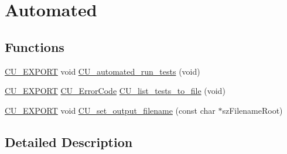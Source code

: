 \hypertarget{group___automated}{\section{Automated}
\label{group___automated}
}
\subsection*{Functions}
\begin{DoxyCompactItemize}
\item 
\hyperlink{group___framework_ga22e538403fdee24be3388ab473fe64d5}{C\+U\+\_\+\+E\+X\+P\+O\+R\+T} void \hyperlink{group___automated_ga4204c6d187aa6c366a8f4e0ba50645b4}{C\+U\+\_\+automated\+\_\+run\+\_\+tests} (void)
\item 
\hyperlink{group___framework_ga22e538403fdee24be3388ab473fe64d5}{C\+U\+\_\+\+E\+X\+P\+O\+R\+T} \hyperlink{group___framework_ga743a2a025ee3eb792d7d85f0eea347e6}{C\+U\+\_\+\+Error\+Code} \hyperlink{group___automated_ga4bf1c3a0b54cb2a12d634e7e022edf30}{C\+U\+\_\+list\+\_\+tests\+\_\+to\+\_\+file} (void)
\item 
\hyperlink{group___framework_ga22e538403fdee24be3388ab473fe64d5}{C\+U\+\_\+\+E\+X\+P\+O\+R\+T} void \hyperlink{group___automated_ga60583b154146b787f03267fc320f86e5}{C\+U\+\_\+set\+\_\+output\+\_\+filename} (const char $\ast$sz\+Filename\+Root)
\end{DoxyCompactItemize}


\subsection{Detailed Description}


